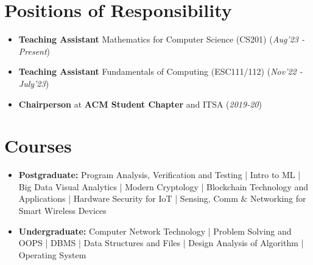 \documentclass[10.8pt, a4paper]{extarticle}
\newcommand{\shorterSection}[1]{\vspace{-10pt}\section{#1}}
\begin{document}
\shorterSection{Positions of Responsibility}
\vspace{-2pt}
\begin{itemize}
    \item \textbf{Teaching Assistant} Mathematics for Computer Science (CS201) \hfill\hfill(\textit{Aug'23 - Present})
    \item \textbf{Teaching Assistant} Fundamentals of Computing (ESC111/112) \hfill\hfill(\textit{Nov'22 - July'23})
    \item \textbf{Chairperson} at \textbf{ACM Student Chapter} and ITSA \hfill\hfill(\textit{2019-20})
\end{itemize}

\shorterSection{Courses}
\vspace{-2pt}
\begin{itemize}
  \item \textbf{Postgraduate:}
    Program Analysis, Verification and Testing |
    Intro to ML |
    Big Data Visual Analytics |
    Modern Cryptology |
    Blockchain Technology and Applications |
    Hardware Security for IoT |
    Sensing, Comm $\&$ Networking for Smart Wireless Devices
  \item \textbf{Undergraduate:}
    Computer Network Technology |
    Problem Solving and OOPS |
    DBMS |
    Data Structures and Files |
    Design Analysis of Algorithm |
    Operating System
\end{itemize}
\end{document}
